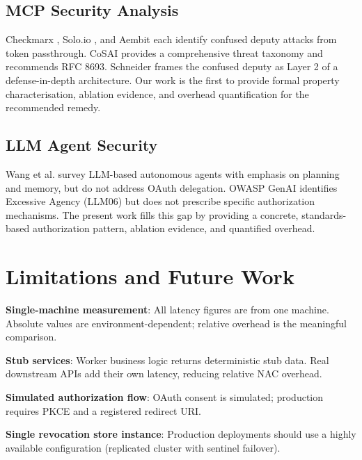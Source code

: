 \documentclass[journal]{IEEEtran}
\begin{document}
\subsection{MCP Security Analysis}

Checkmarx \cite{checkmarx_mcp}, Solo.io \cite{solo_mcp}, and Aembit
\cite{aembit_mcp} each identify confused deputy attacks from token passthrough.
CoSAI \cite{cosai_mcp} provides a comprehensive threat taxonomy and recommends
RFC 8693. Schneider \cite{schneider_mcp} frames the confused deputy as Layer 2
of a defense-in-depth architecture. Our work is the first to provide formal
property characterisation, ablation evidence, and overhead quantification for the
recommended remedy.

\subsection{LLM Agent Security}

Wang et al. \cite{wang2024survey} survey LLM-based autonomous agents with
emphasis on planning and memory, but do not address OAuth delegation. OWASP GenAI
\cite{owasp_genai} identifies Excessive Agency (LLM06) but does not prescribe
specific authorization mechanisms. The present work fills this gap by providing
a concrete, standards-based authorization pattern, ablation evidence, and
quantified overhead.


\section{Limitations and Future Work}
\label{sec:limitations}

\textbf{Single-machine measurement}: All latency figures are from one machine.
Absolute values are environment-dependent; relative overhead is the meaningful
comparison.

\textbf{Stub services}: Worker business logic returns deterministic stub data.
Real downstream APIs add their own latency, reducing relative NAC overhead.

\textbf{Simulated authorization flow}: OAuth consent is simulated; production
requires PKCE \cite{rfc7636} and a registered redirect URI.

\textbf{Single revocation store instance}: Production deployments should use a
highly available configuration (replicated cluster with sentinel failover).
\end{document}
